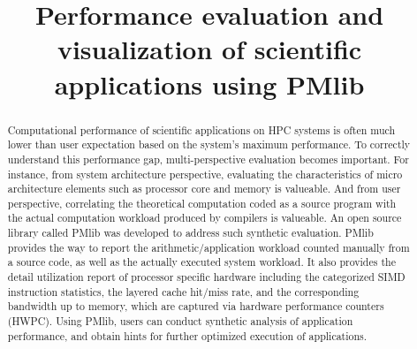 \documentclass[conference]{IEEEtran}
\begin{document}
\title{
%
%
Performance evaluation and visualization of scientific applications using PMlib
}

\author{
\and
{}
\and
{}
}

\maketitle

\begin{abstract}
Computational performance of scientific applications on HPC systems
is often much lower than user expectation based on the system's maximum
performance.
To correctly understand this performance gap, multi-perspective evaluation
becomes important.
For instance, from system architecture perspective,
evaluating the characteristics of micro architecture elements such as
processor core and memory is valueable.
And from user perspective, correlating the theoretical computation coded
as a source program with the actual computation workload produced by compilers
is valueable.
An open source library called PMlib was developed to address such synthetic
evaluation.
PMlib provides the way to report the arithmetic/application workload
counted manually from a source code,
as well as the actually executed system workload.
It also provides the detail utilization report of processor specific hardware
including the categorized SIMD instruction statistics, the layered cache
hit/miss rate, and the corresponding bandwidth up to memory,
which are captured via hardware performance counters (HWPC).
Using PMlib, users can conduct synthetic analysis of application
performance, and obtain hints for further optimized execution of applications.
\end{abstract}
\end{document}
